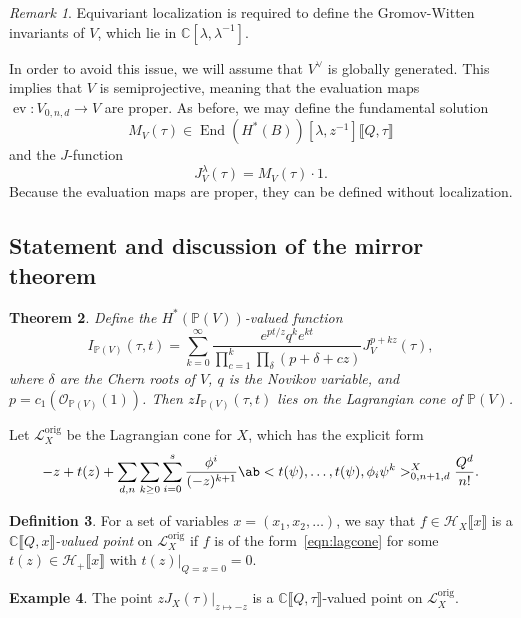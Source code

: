 \documentclass[leqno, openany]{memoir}
\newtheorem{thm}{Theorem}[section]
\theoremstyle{definition}
\newtheorem{defn}[thm]{Definition}
\newtheorem{exm}[thm]{Example}
\theoremstyle{remark}
\newtheorem{rmk}[thm]{Remark}
\theoremstyle{plain}
\theoremstyle{definition}
\theoremstyle{remark}
\newcommand{\C}{\mathbb{C}}
\renewcommand{\P}{\mathbb{P}}
\newcommand{\mc}[1]{\mathcal{#1}}
\newcommand{\mr}[1]{\mathrm{#1}}
\newcommand{\on}[1]{\operatorname{#1}}
\DeclareMathOperator{\End}{End}
\begin{document}
\begin{rmk}
    Equivariant localization is required to define the Gromov-Witten invariants of $V$, which lie in $\C[\lambda, \lambda^{-1}]$.
\end{rmk}

In order to avoid this issue, we will assume that $V^{\vee}$ is globally generated. This implies that $V$ is semiprojective, meaning that the evaluation maps $\on{ev} \colon V_{0,n,d} \to V$ are proper. As before, we may define the fundamental solution
\[ M_V(\tau) \in \End(H^*(B))[\lambda, z^{-1}] \llbracket Q, \tau \rrbracket \]
and the $J$-function
\[ J_V^{\lambda}(\tau) = M_V(\tau) \cdot 1. \]
Because the evaluation maps are proper, they can be defined without localization.

\subsection{Statement and discussion of the mirror theorem}%
\label{sub:Statement and discussion of the mirror theorem}


\begin{thm}\label{thm:projbundlemirror}
    Define the $H^*(\P(V))$-valued function
    \[ I_{\P(V)}(\tau, t) = \sum_{k=0}^{\infty} \frac{e^{pt/z} q^k e^{kt}}{\prod_{c=1}^k \prod_{\delta} (p+\delta  + cz)} J_V^{p+kz}(\tau), \]
    where $\delta$ are the Chern roots of $V$, $q$ is the Novikov variable, and $p = c_1(\mc{O}_{\P(V)}(1))$. Then $z I_{\P(V)}(\tau, t)$ lies on the Lagrangian cone of $\P(V)$.
\end{thm}

Let $\mc{L}_X^{\mr{orig}}$ be the Lagrangian cone for $X$, which has the explicit form
\begin{equation}\label{eqn:lagcone}
    -z + t(z) + \sum_{d,n} \sum_{k\geq 0} \sum_{i=0}^s \frac{\phi^i}{(-z)^{k+1}} \ab<t(\psi), \ldots, t(\psi), \phi_i \psi^k>_{0,n+1,d}^X \frac{Q^d}{n!}. 
\end{equation}

\begin{defn}
    For a set of variables $x = (x_1, x_2, \ldots)$, we say that $f \in \mc{H}_X \llbracket x \rrbracket$ is a \textit{$\C\llbracket Q,x \rrbracket$-valued point} on $\mc{L}_X^{\mr{orig}}$ if $f$ is of the form~\ref{eqn:lagcone} for some $t(z) \in \mc{H}_+ \llbracket x \rrbracket$ with $t(z)|_{Q=x=0} = 0$.
\end{defn}

\begin{exm}
    The point $z J_X(\tau)|_{z \mapsto -z}$ is a $\C\llbracket Q,\tau \rrbracket$-valued point on $\mc{L}_X^{\mr{orig}}$.
\end{exm}
\end{document}
